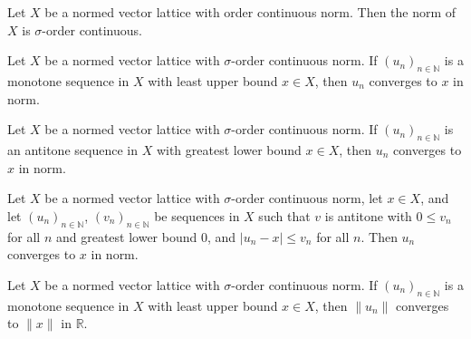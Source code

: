 \begin{lemma}
\label{lem:isOrderContinuousNorm-toIsSigmaOrderContinuousNorm}
\leanok
{}
Let $X$ be a normed vector lattice with order continuous norm.
Then the norm of $X$ is $\sigma$-order continuous.
\end{lemma}

\begin{lemma}
\label{lem:isSigmaOrderContinuousNorm-tendsto-of-monotone-isLUB}
\leanok
{}
Let $X$ be a normed vector lattice with $\sigma$-order continuous
norm. If $(u_n)_{n \in \mathbb{N}}$ is a monotone sequence in $X$
with least upper bound $x \in X$, then $u_n$ converges to $x$ in
norm.
\end{lemma}

\begin{lemma}
\label{lem:isSigmaOrderContinuousNorm-tendsto-of-antitone-isGLB}
\leanok
{}
Let $X$ be a normed vector lattice with $\sigma$-order continuous
norm. If $(u_n)_{n \in \mathbb{N}}$ is an antitone sequence in $X$
with greatest lower bound $x \in X$, then $u_n$ converges to $x$
in norm.
\end{lemma}

\begin{lemma}
\label{lem:isSigmaOrderContinuousNorm-tendsto-of-abs-sub-le-antitone}
\leanok
{}
Let $X$ be a normed vector lattice with $\sigma$-order continuous
norm, let $x \in X$, and let $(u_n)_{n \in \mathbb{N}}$,
$(v_n)_{n \in \mathbb{N}}$ be sequences in $X$ such that $v$ is
antitone with $0 \le v_n$ for all $n$ and greatest lower bound
$0$, and $\lvert u_n - x \rvert \le v_n$ for all $n$. Then $u_n$
converges to $x$ in norm.
\end{lemma}

\begin{lemma}
\label{lem:isSigmaOrderContinuousNorm-tendsto-norm-of-monotone-isLUB}
\leanok
{}
Let $X$ be a normed vector lattice with $\sigma$-order continuous
norm. If $(u_n)_{n \in \mathbb{N}}$ is a monotone sequence in $X$
with least upper bound $x \in X$, then $\lVert u_n \rVert$
converges to $\lVert x \rVert$ in $\mathbb{R}$.
\end{lemma}

